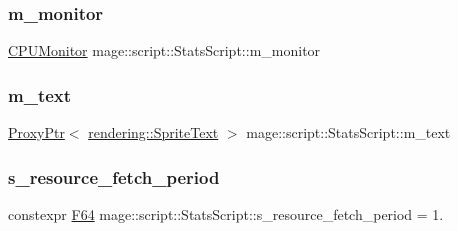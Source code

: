 \hypertarget{classmage_1_1script_1_1_stats_script_ae5b97f07da7adb0740cd68cf2c4abbf5}{}\label{classmage_1_1script_1_1_stats_script_ae5b97f07da7adb0740cd68cf2c4abbf5} 
\subsubsection{\texorpdfstring{m\+\_\+monitor}{m\_monitor}}
{\footnotesize\ttfamily \hyperlink{classmage_1_1_c_p_u_monitor}{C\+P\+U\+Monitor} mage\+::script\+::\+Stats\+Script\+::m\+\_\+monitor\hspace{0.3cm}{\ttfamily [private]}}

\hypertarget{classmage_1_1script_1_1_stats_script_a1fe11e7a3622fa5e3585fb6786e2d2e7}{}\label{classmage_1_1script_1_1_stats_script_a1fe11e7a3622fa5e3585fb6786e2d2e7} 
\subsubsection{\texorpdfstring{m\+\_\+text}{m\_text}}
{\footnotesize\ttfamily \hyperlink{classmage_1_1_proxy_ptr}{Proxy\+Ptr}$<$ \hyperlink{classmage_1_1rendering_1_1_sprite_text}{rendering\+::\+Sprite\+Text} $>$ mage\+::script\+::\+Stats\+Script\+::m\+\_\+text\hspace{0.3cm}{\ttfamily [private]}}

\hypertarget{classmage_1_1script_1_1_stats_script_adad03ab9bd20bde0709365d43a4158fd}{}\label{classmage_1_1script_1_1_stats_script_adad03ab9bd20bde0709365d43a4158fd} 
\subsubsection{\texorpdfstring{s\+\_\+resource\+\_\+fetch\+\_\+period}{s\_resource\_fetch\_period}}
{\footnotesize\ttfamily constexpr \hyperlink{namespacemage_ad26233bbec640deda836e572c1a23708}{F64} mage\+::script\+::\+Stats\+Script\+::s\+\_\+resource\+\_\+fetch\+\_\+period = 1.\hspace{0.3cm}{\ttfamily [static]}}

